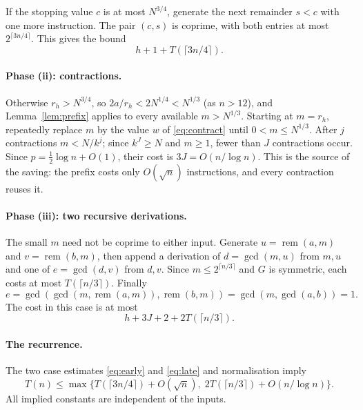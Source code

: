\documentclass[11pt]{article}
\theoremstyle{remark}
\newcommand{\rem}{\operatorname{rem}}
\begin{document}
If the stopping value $c$ is at most $N^{3/4}$, generate the next
remainder $s<c$ with one more instruction. The pair $(c,s)$ is coprime, with
both entries at most $2^{\lceil3n/4\rceil}$. This gives the bound
\begin{equation}\label{eq:early}
h+1+T(\lceil3n/4\rceil).
\end{equation}

\paragraph{Phase (ii): contractions.}
Otherwise $r_h>N^{3/4}$, so $2a/r_h<2N^{1/4}<N^{1/3}$ (as $n>12$), and
Lemma~\ref{lem:prefix} applies to every available
$m>N^{1/3}$. Starting at $m=r_h$, repeatedly replace $m$ by the value $w$ of
\eqref{eq:contract} until $0<m\leq N^{1/3}$. After $j$ contractions
$m<N/k^j$; since $k^J\geq N$ and $m\geq1$, fewer than $J$ contractions occur. Since
$p=\tfrac12\log n+O(1)$, their cost is $3J=O(n/\log n)$.
This is the source of the saving: the prefix costs only $O(\sqrt n)$
instructions, and every contraction reuses it.

\paragraph{Phase (iii): two recursive derivations.}
The small $m$ need not be coprime to either input. Generate
$u=\rem(a,m)$ and $v=\rem(b,m)$, then append a derivation of $d=\gcd(m,u)$
from $m,u$ and one of $e=\gcd(d,v)$ from $d,v$. Since
$m\leq2^{\lceil n/3\rceil}$ and $G$ is symmetric, each costs at most
$T(\lceil n/3\rceil)$. Finally
\[
e=\gcd(\gcd(m,\rem(a,m)),\rem(b,m))
 =\gcd(m,\gcd(a,b))=1.
\]
The cost in this case is at most
\begin{equation}\label{eq:late}
h+3J+2+2T(\lceil n/3\rceil).
\end{equation}

\paragraph{The recurrence.}
The two case estimates \eqref{eq:early} and \eqref{eq:late} and normalisation
imply
\begin{equation}\label{eq:recurrence}
T(n)\leq\max\{T(\lceil3n/4\rceil)+O(\sqrt n),\;
2T(\lceil n/3\rceil)+O(n/\log n)\}.
\end{equation}
All implied constants are independent of the inputs.
\end{document}
